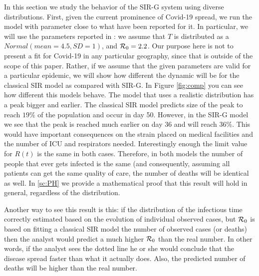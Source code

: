 \documentclass[twoside,USenglish,10pt]{article}
\newcommand{\Ro}{\ensuremath\mathcal{R}_0\xspace}
\begin{document}
In this section we study the behavior of the SIR-G system using diverse distributions.
First, given the current prominence of Covid-19 spread, we run the model with parameter close to what have been reported for it. In particular, we will use the parameters reported in \cite{lour.ea20}: we assume that $T$ is distributed as a $Normal(mean=4.5, SD=1)$, and $\Ro=2.2$. Our purpose here is not to present a fit for Covid-19 in any particular geography, since that is outside of the scope of this paper. Rather, if we assume that the given parameters are valid for a particular epidemic, we will show how different the dynamic will be for the classical SIR model as compared with SIR-G. In Figure \ref{fig:comp} you can see how different this models behave. The model that uses a realistic distribution has a peak bigger and earlier. The classical SIR model predicts size of the peak to reach $19\%$ of the population and occur in day 50. However, in the SIR-G model we see that the peak is reached much earlier on day 36 and will reach $36\%$. This would have important consequences on the strain placed on medical facilities and the number of ICU and respirators needed.  Interestingly enough the limit value for $R(t)$ is the same in both cases. Therefore, in both models the number of people that ever gets infected is the same (and consequently, assuming all patients can get the same quality of care, the number of deaths will be identical as well. In \ref{sc:PH} we provide a mathematical proof that this result will hold in general, regardless of the distribution.

Another way to see this result is this: if the distribution of the infectious time correctly estimated based on the evolution of individual observed cases, but $\Ro$ is based on fitting a classical SIR model the number of observed cases (or deaths) then the analyst would predict a much higher $\Ro$ than the real number. In other words, if the analyst sees the dotted line he or she would conclude that the disease spread faster than what it actually does. Also, the predicted number of deaths will be higher than the real number.
\end{document}
